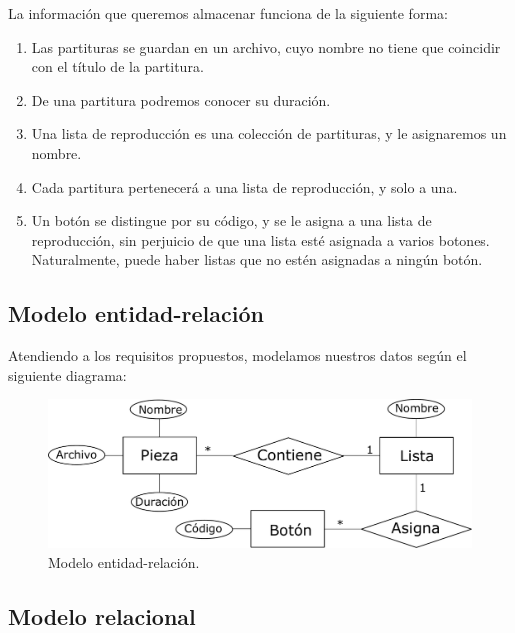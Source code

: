 La información que queremos almacenar funciona de la siguiente forma:

\begin{enumerate}
	\item Las partituras se guardan en un archivo, cuyo nombre no tiene que coincidir con el título de la partitura.
	\item De una partitura podremos conocer su duración.
	\item Una lista de reproducción es una colección de partituras, y le asignaremos un nombre.
	\item Cada partitura pertenecerá a una lista de reproducción, y solo a una.
	\item Un botón se distingue por su código, y se le asigna a una lista de reproducción, sin perjuicio de que una lista esté asignada a varios botones. Naturalmente, puede haber listas que no estén asignadas a ningún botón.
\end{enumerate}

\subsection{Modelo entidad-relación}

Atendiendo a los requisitos propuestos, modelamos nuestros datos según el siguiente diagrama:

\smallskip

\begin{figure}[H]
	\noindent \begin{centering}
		\includegraphics[width=\linewidth*3/4]{capitulo4/bd_er}
		\par\end{centering}
	\smallskip
	\caption{\label{fig:bd_er} Modelo entidad-relación.}
\end{figure} 

\smallskip

\subsection{Modelo relacional}

